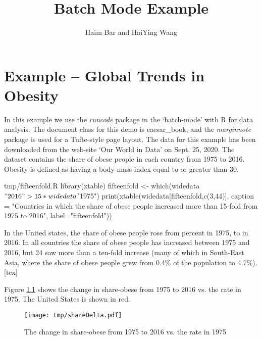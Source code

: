 \documentclass{caesar_book}
\title{Batch Mode Example}
\author{Haim Bar and HaiYing Wang}
\begin{document}
\mainmatter
\chapter{Example -- Global Trends in Obesity}
In this example  we use the \textit{runcode} package in the `batch-mode' with R for data analysis. The document class for this demo is caesar\_book, and the \textit{marginnote} package is used for a Tufte-style page layout.
The data for this example has been downloaded from the web-site `Our World in Data'
 on Sept. 25, 2020. The dataset contains the share of obese people in each country from 1975 to 2016. Obesity is defined as having a body-mass index equal to or greater than 30.

\begin{filecontents*}{tmp/fifteenfold.R}
library(xtable)
fifteenfold <- which(widedata$"2016" > 15*widedata$"1975")
print(xtable(widedata[fifteenfold,c(3,44)], caption = "Countries in which the share of obese people increased more than 15-fold from 1975 to 2016", label="fifteenfold"))
\end{filecontents*}

In the United states, the share of obese people rose from   percent in 1975, to  in 2016. 
In all countries the share of obese people has increased between 1975 and 2016, but 24 saw more than a ten-fold increase (many of which in South-East Asia, where the share of obese people grew from 0.4\% of the population to 4.7\%).
[tex]

Figure \ref{sharegain} shows the change in share-obese from 1975 to 2016 vs. the rate in 1975. The United States is shown in red.

\begin{figure}[t]
\begin{center}
\texttt{[image: tmp/shareDelta.pdf]}
\caption{The change in share-obese from 1975 to 2016 vs. the rate in 1975}
\label{sharegain}
\end{center}
\end{figure}
\end{document}
